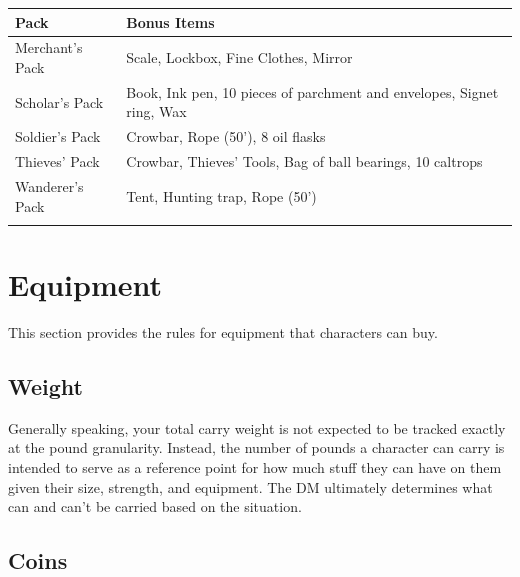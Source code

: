 \documentclass[12pt,letterpaper,twocolumn,openany,nodeprecatedcode,bg=none]{dndbook}
\let\oldsubsection\subsection
\renewcommand{\subsection}[1]{%
  \needspace{5\baselineskip}%
  \oldsubsection{#1}%
}
\begin{document}
{\def\LTcaptype{none} %
\begin{table}[!htbp]
\centering
\begin{tabular}{@{}
  >{\raggedright\arraybackslash}p{}
  >{\raggedright\arraybackslash}p{}@{}}
\toprule\noalign{}
\begin{minipage}[b]{\linewidth}\raggedright
Pack
\end{minipage} & \begin{minipage}[b]{\linewidth}\raggedright
Bonus Items
\end{minipage} \\
\midrule\noalign{}
Merchant's Pack & Scale, Lockbox, Fine Clothes, Mirror \\
Scholar's Pack & Book, Ink pen, 10 pieces of parchment and envelopes,
Signet ring, Wax \\
Soldier's Pack & Crowbar, Rope (50'), 8 oil flasks \\
Thieves' Pack & Crowbar, Thieves' Tools, Bag of ball bearings, 10
caltrops \\
Wanderer's Pack & Tent, Hunting trap, Rope (50') \\
\bottomrule\noalign{}
\end{tabular}
\end{table}
}

\twocolumn

\section{Equipment}\label{equipment-1}

This section provides the rules for equipment that characters can buy.

\subsection{Weight}\label{weight}

Generally speaking, your total carry weight is not expected to be
tracked exactly at the pound granularity. Instead, the number of pounds
a character can carry is intended to serve as a reference point for how
much stuff they can have on them given their size, strength, and
equipment. The DM ultimately determines what can and can't be carried
based on the situation.

\subsection{Coins}\label{coins}
\end{document}
